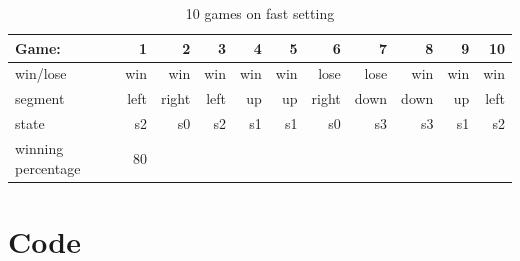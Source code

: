 \documentclass[11pt]{article}
\begin{document}
\begin{table}[ht]\centering
	\caption{10 games on fast setting}
	\label{ALU:tbl:alu_ERT}\medskip
	\begin{tabular}{l|rrrrrrrrrr}
		Game: & 1 & 2 & 3 & 4 & 5 & 6 & 7 & 8 & 9 & 10 \\
		\midrule
		win/lose & win & win & win & win & win & lose & lose & win & win & win\\
		segment & left & right & left & up & up & right & down & down & up & left \\
		state & s2 & s0 & s2 & s1 & s1 & s0 & s3 & s3 & s1 & s2\\
		\midrule
		winning percentage & 80 &  &  &  &  & & & & &\\
		\bottomrule
	\end{tabular}
\end{table}

\section*{Code}
\end{document}
